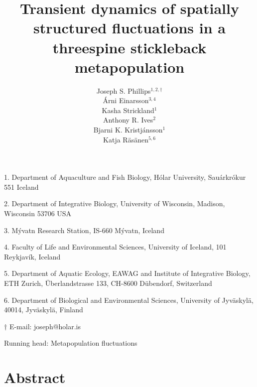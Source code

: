 \documentclass[11pt]{article}
\title{Transient dynamics of spatially structured fluctuations 
        in a threespine stickleback metapopulation}
\author{
Joseph S. Phillips$^{1,2, \dagger}$ \\
\'{A}rni Einarsson$^{3,4}$ \\ 
Kasha Strickland$^{1}$ \\
Anthony R. Ives$^{2}$ \\
Bjarni K. Kristj\'{a}nsson$^{1}$ \\
Katja R\"{a}s\"{a}nen$^{5,6}$ 
}
\date{}
\begin{document}
\raggedright
\setlength\parindent{0.25in}

\maketitle


\noindent{} 1. Department of Aquaculture and Fish Biology, 
H\'{o}lar University, Sau{\dh}\'{a}rkr\'{o}kur 551 Iceland

\noindent{} 2. Department of Integrative Biology, 
University of Wisconsin, Madison, Wisconsin 53706 USA

\noindent{} 3. M\'{y}vatn Research Station, IS-660 M\'{y}vatn, Iceland

\noindent{} 4. Faculty of Life and Environmental Sciences, 
              University of Iceland, 101 Reykjav\'{i}k, Iceland

\noindent{} 5. Department of Aquatic Ecology, EAWAG and 
Institute of Integrative Biology, ETH Zurich, 
\"{U}berlandstrasse 133, CH-8600 D\"{u}bendorf, Switzerland

\noindent{} 6. Department of Biological and Environmental Sciences, 
University of Jyv\"{a}skyl\"{a}, 40014, Jyv\"{a}skyl\"{a}, Finland

\noindent{} $\dagger$ E-mail: joseph@holar.is



\bigskip

Running head: {Metapopulation fluctuations}

\linenumbers{}

\clearpage






\section*{Abstract} \label{abstract}
\end{document}
